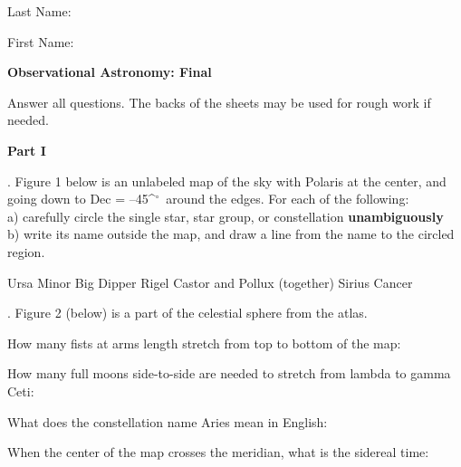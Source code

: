 \documentclass[11pt]{article}
\begin{document}
\def\arcsec{\ifmmode {^{\scriptscriptstyle\prime\prime}}
          \else $^{\scriptscriptstyle\prime\prime}$\fi}
\def\arcmin{\ifmmode {^{\scriptscriptstyle\prime}}
          \else $^{\scriptscriptstyle\prime}$\fi}
\def\deg{\ifmmode^\circ\else$^\circ$\fi}



{  \hfill Last Name:\,\makebox[6cm]{\hrulefill}}

{ \hfill First Name:\,\makebox[6cm]{\hrulefill}}

\vspace{0.5cm} 
\begin{center}
{\large \bf Observational Astronomy: Final} \\
\end{center}

\noindent Answer all questions. The backs of the sheets may be used
for rough work if needed.

\bigskip
{\bf Part I}

. Figure 1 below is an unlabeled map of the sky with Polaris at the center, and
going down to Dec = --45\deg\ around the edges.  For each of the
following: \\
a) carefully circle the single star, star group, or constellation
{\bf unambiguously} \\ 
b) write its name outside the map, and draw a line from
the name to the circled region.

\bigskip
Ursa Minor \hspace{0.5cm} Big Dipper \hspace{0.5cm} Rigel
\hspace{0.5cm} Castor and Pollux (together) \hspace{0.5cm} Sirius
\hspace{0.5cm} Cancer \hspace{0.5cm}
  

. Figure 2 (below) is a part of the celestial sphere from the atlas.

\bigskip
How many fists at arms length stretch from top to bottom of the map:
\makebox[4cm]{\hrulefill}

\medskip
How many full moons side-to-side are needed to stretch from lambda to
gamma Ceti: \makebox[4cm]{\hrulefill}

\medskip
What does the constellation name Aries mean in English:
\makebox[4cm]{\hrulefill} 

\medskip
When the center of the map crosses the meridian, what is the
sidereal time:  \makebox[4cm]{\hrulefill} 
\end{document}
